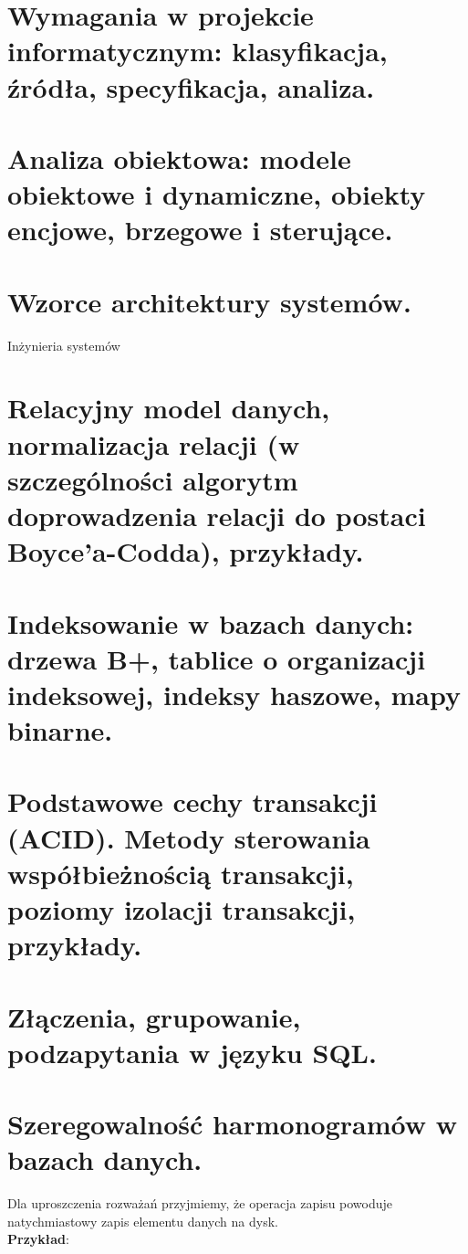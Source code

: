 \documentclass[12pt]{article}
\begin{document}
    \section{Wymagania w projekcie informatycznym: klasyfikacja, źródła, specyfikacja, analiza.}
    \section{Analiza obiektowa: modele obiektowe i dynamiczne, obiekty encjowe, brzegowe i sterujące.}
    \section{Wzorce architektury systemów.}

    {\Large Inżynieria systemów}

    \section{Relacyjny model danych, normalizacja relacji (w szczególności algorytm doprowadzenia relacji do postaci Boyce’a-Codda), przykłady.}
    \section{Indeksowanie w bazach danych: drzewa B+, tablice o organizacji indeksowej, indeksy haszowe, mapy binarne.}
    \section{Podstawowe cechy transakcji (ACID). Metody sterowania współbieżnością transakcji, poziomy izolacji transakcji, przykłady.}
    \section{Złączenia, grupowanie, podzapytania w języku SQL.}

    \newpage

    \section{Szeregowalność harmonogramów w bazach danych.}

    Dla uproszczenia rozważań przyjmiemy, że operacja zapisu powoduje natychmiastowy zapis elementu danych na dysk.\\

    \textbf{Przykład}:\\
\end{document}
